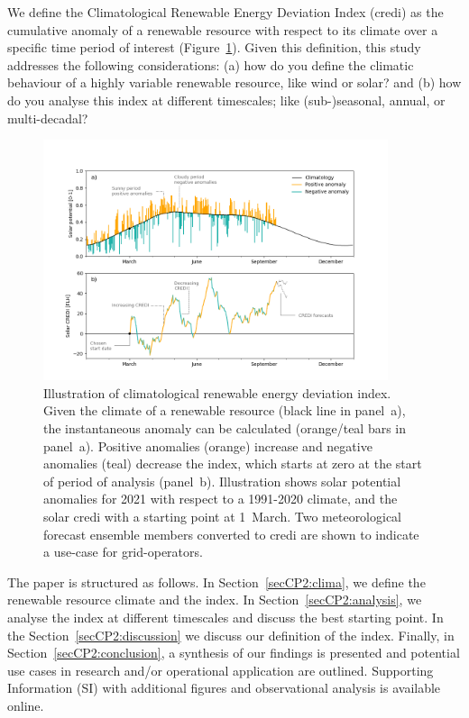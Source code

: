 \documentclass[a4paper,11pt]{extarticle}
\newcommand{\credi}[0]{{\sc credi}}
\newcommand{\sdi}[0]{{\sc solar credi}}
\begin{document}
We define the Climatological Renewable Energy Deviation Index (\credi) as the cumulative anomaly of a renewable resource with respect to its climate over a specific time period of interest (Figure~\ref{fig:overview}). 
Given this definition, this study addresses the following considerations: (a) how do you define the climatic behaviour of a highly variable renewable resource, like wind or solar? and (b) how do you analyse this index at different timescales; like (sub-)seasonal, annual, or multi-decadal?

\begin{figure}[h]
        \centering
        \includegraphics[width=0.9\textwidth]{Schematic_CREDI}
        \caption{
                Illustration of climatological renewable energy deviation index. 
                Given the climate of a renewable resource (black line in panel~a), the instantaneous anomaly can be calculated (orange/teal bars in panel~a). 
                Positive anomalies (orange) increase and negative anomalies (teal) decrease the index, which starts at zero at the start of period of analysis (panel~b). 
                Illustration shows solar potential anomalies for 2021 with respect to a 1991-2020 climate, and the \sdi{} with a starting point at 1~March. 
                Two meteorological forecast ensemble members converted to \credi{} are shown to indicate a use-case for grid-operators. }
        \label{fig:overview}
\end{figure}

The paper is structured as follows. 
In Section~\ref{secCP2:clima}, we define the renewable resource climate and the index. 
In Section~\ref{secCP2:analysis}, we analyse the index at different timescales and discuss the best starting point. 
In the Section~\ref{secCP2:discussion} we discuss our definition of the index. 
Finally, in Section~\ref{secCP2:conclusion}, a synthesis of our findings is presented and potential use cases in research and/or operational application are outlined. 
Supporting Information (SI) with additional figures and observational analysis is available online.
\end{document}
